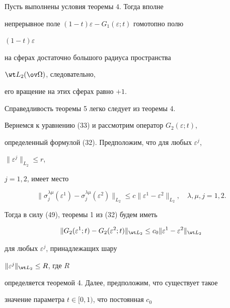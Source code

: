  


\begin{thm} Пусть выполнены условия теоремы $4$. Тогда вполне 


непрерывное поле $(1-t)\varepsilon-G_1(\varepsilon;t)$ гомотопно полю 


$(1-t)\varepsilon$ 


на сферах достаточно большого радиуса пространства 


$\wt L_2(\ov\Omega)$, следовательно, 


его вращение на этих сферах равно $+1$. 


\end{thm} 


 


Справедливость теоремы 5 легко следует из теоремы 4. 


 


Вернемся к уравнению (33) и рассмотрим оператор $G_2(\varepsilon;t)$, 


определенный формулой (32). Предположим, что для любых $\varepsilon^j$, 


$\|\varepsilon^j\|_{L_2}\le r$, 


$j=1,2$, имеет место 


\begin{equation} 


\|\sigma^{\lambda\mu}_j(\varepsilon^1)- 


\sigma^{\lambda\mu}_j(\varepsilon^2)\|_{L_2}\le 


c\|\varepsilon^1-\varepsilon^2\|_{L_2},\quad \lambda,\mu,j=1,2. 


\end{equation} 


Тогда в силу (49), теоремы 1 из (32) будем иметь 


\begin{equation} 


\|G_2(\varepsilon^1;t)-G_2(\varepsilon^2;t)\|_{\wt L_2}\le 


c_0\|\varepsilon^1-\varepsilon^2\|_{\wt L_2} 


\end{equation} 


для любых $\varepsilon^j$, принадлежащих шару 


$\|\varepsilon^j\|_{\wt L_2}\le R$, где $R$ 


определяется теоремой 4. Далее, предположим, что существует такое 


значение параметра $t\in[0,1)$, что постоянная $c_0$ 


